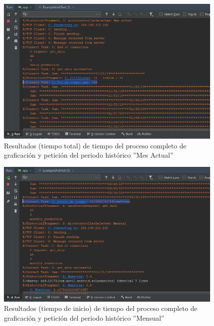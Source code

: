 \begin{figure}[H]
	\centering
	\includegraphics[scale=.6]{Capitulo5/images/TiempoCompletoMesActual2.png}
	\caption{Resultados (tiempo total) de tiempo del proceso completo de graficación y petición del periodo histórico ''Mes Actual''}	\label{fig:TiempoCompletoHMesActual2}
\end{figure} 
\begin{figure}[H]
	\centering
	\includegraphics[scale=.6]{Capitulo5/images/TiempoCompletoMensual.png}
	\caption{Resultados (tiempo de inicio) de tiempo del proceso completo de graficación y petición del periodo histórico ''Mensual''}	\label{fig:TiempoCompletoHMensual}
\end{figure} 
